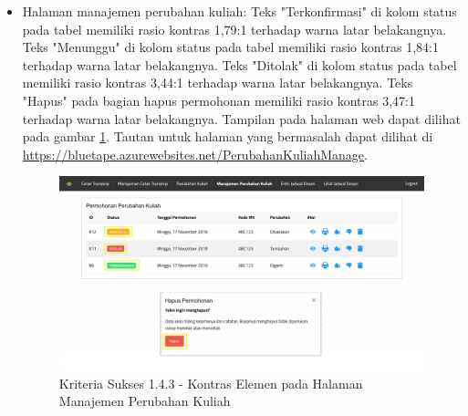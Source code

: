\documentclass[a4paper,twoside]{article}
\begin{document}
\begin{enumerate}
\begin{itemize}
			\item Halaman manajemen perubahan kuliah: Teks "Terkonfirmasi" di kolom status pada tabel memiliki rasio kontras 1,79:1 terhadap warna latar belakangnya. Teks "Menunggu" di kolom status pada tabel memiliki rasio kontras 1,84:1 terhadap warna latar belakangnya. Teks "Ditolak" di kolom status pada tabel memiliki rasio kontras 3,44:1 terhadap warna latar belakangnya. Teks "Hapus" pada bagian hapus permohonan memiliki rasio kontras 3,47:1 terhadap warna latar belakangnya. Tampilan pada halaman web dapat dilihat pada gambar \ref{fig:1.4.3_contrast_minimum_5}. Tautan untuk halaman yang bermasalah dapat dilihat di \url{https://bluetape.azurewebsites.net/PerubahanKuliahManage}.
			\begin{figure}[H]
				\centering  
				\includegraphics[scale=0.3, frame]{kriteria-sukses-1-4-3-contrast-minimum-5}  
				\caption[Kriteria Sukses 1.4.3 - Kontras Elemen pada Halaman Manajemen Perubahan Kuliah]{Kriteria Sukses 1.4.3 - Kontras Elemen pada Halaman Manajemen Perubahan Kuliah}
				\label{fig:1.4.3_contrast_minimum_5}  
			\end{figure} 


\end{itemize}
\end{enumerate}
\end{document}
